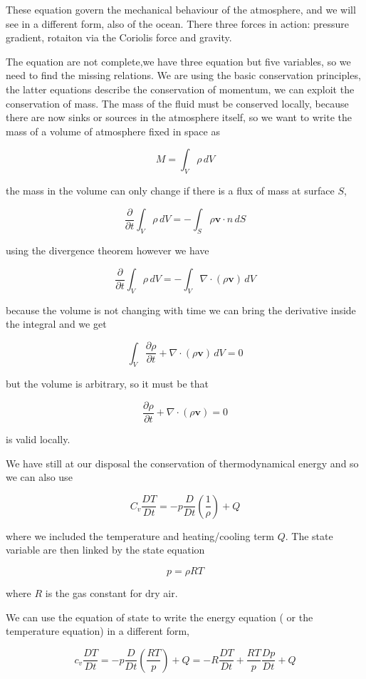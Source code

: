 These equation govern the mechanical behaviour of the atmosphere, and we
will see in a different form, also of the ocean. There three forces in
action: pressure gradient, rotaiton via the Coriolis force and gravity.

The equation are not complete,we have three equation but five variables,
so we need to find the missing relations. We are using the basic
conservation principles, the latter equations describe the conservation
of momentum, we can exploit the conservation of mass. The mass of the
fluid must be conserved locally, because there are now sinks or sources
in the atmosphere itself, so we want to write the mass of a volume of
atmosphere fixed in space as

\[M = \int_V  \rho \,dV\]

the mass in the volume can only change if there is a flux of mass at
surface \(S\),

\[\frac{\partial }{\partial t} \int_V  \rho \,dV = -\int_S \rho\mathbf{v}\cdot n \, dS\]

using the divergence theorem however we have

\[\frac{\partial }{\partial t} \int_V  \rho \,dV = -\int_V \nabla\cdot(\rho\mathbf{v}) \,dV\]

because the volume is not changing with time we can bring the derivative
inside the integral and we get

\[\int_V  \frac{\partial \rho}{\partial t}+\nabla\cdot(\rho\mathbf{v}) \,dV = 0\]

but the volume is arbitrary, so it must be that

\[\frac{\partial \rho}{\partial t}+\nabla\cdot(\rho\mathbf{v}) = 0\]

is valid locally.

We have still at our disposal the conservation of thermodynamical energy
and so we can also use

\[C_v\frac{D T}{Dt} = -p\frac{D }{Dt}\left(\frac{1}{\rho}\right)+ Q\]

where we included the temperature and heating/cooling term \(Q\). The
state variable are then linked by the state equation

\[p = \rho R T\]

where \(R\) is the gas constant for dry air.

We can use the equation of state to write the energy equation ( or the
temperature equation) in a different form,

\[c_v\frac{D T}{Dt} = -p\frac{D }{Dt}\left(\frac{R T}{p}\right)+ Q = -R\frac{D T}{Dt} + \frac{RT}{p}\frac{D p}{Dt} + Q\]

